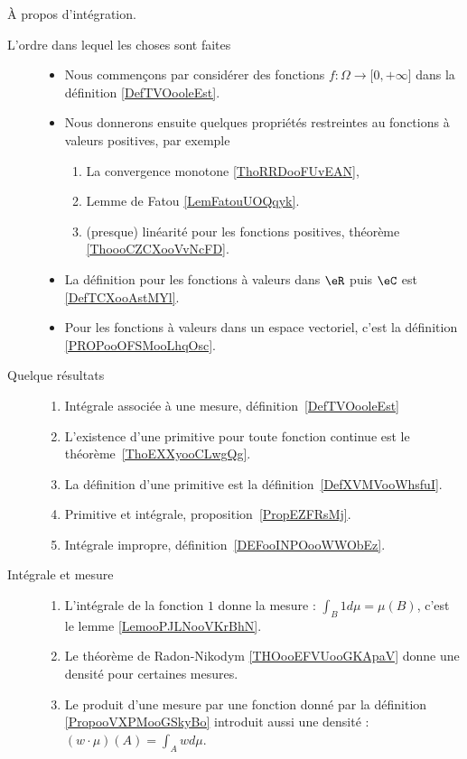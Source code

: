      \label{THEMEooHINHooJaSYQW}

À propos d'intégration.
\begin{description}

\item[L'ordre dans lequel les choses sont faites]
\begin{itemize}
    \item 
        Nous commençons par considérer des fonctions \( f\colon \Omega\to \mathopen[ 0 , +\infty \mathclose]\) dans la définition \ref{DefTVOooleEst}.
    \item
        Nous donnerons ensuite quelques propriétés restreintes au fonctions à valeurs positives, par exemple
        \begin{enumerate}
            \item
                La convergence monotone \ref{ThoRRDooFUvEAN},
            \item
                Lemme de Fatou \ref{LemFatouUOQqyk}.
            \item 
                (presque) linéarité pour les fonctions positives, théorème \ref{ThoooCZCXooVvNcFD}.
        \end{enumerate}
        \item
            La définition pour les fonctions à valeurs dans \( \eR\) puis \( \eC\) est \ref{DefTCXooAstMYl}.
        \item
            Pour les fonctions à valeurs dans un espace vectoriel, c'est la définition \ref{PROPooOFSMooLhqOsc}.
\end{itemize}
    \item[Quelque résultats] 
\begin{enumerate}
    \item
        Intégrale associée à une mesure, définition~\ref{DefTVOooleEst}
\item
    L'existence d'une primitive pour toute fonction continue est le théorème~\ref{ThoEXXyooCLwgQg}.
\item
    La définition d'une primitive est la définition~\ref{DefXVMVooWhsfuI}.
\item
    Primitive et intégrale, proposition~\ref{PropEZFRsMj}.
\item
    Intégrale impropre, définition~\ref{DEFooINPOooWWObEz}.
\end{enumerate}
\item[Intégrale et mesure]
    \begin{enumerate}
        \item
            L'intégrale de la fonction \( 1\) donne la mesure : \( \int_B1d\mu=\mu(B)\), c'est le lemme \ref{LemooPJLNooVKrBhN}.
        \item
            Le théorème de Radon-Nikodym \ref{THOooEFVUooGKApaV} donne une densité pour certaines mesures.
        \item
            Le produit d'une mesure par une fonction donné par la définition \ref{PropooVXPMooGSkyBo} introduit aussi une densité : \( (w\cdot \mu)(A)=\int_Awd\mu\).
    \end{enumerate}


\end{description}
